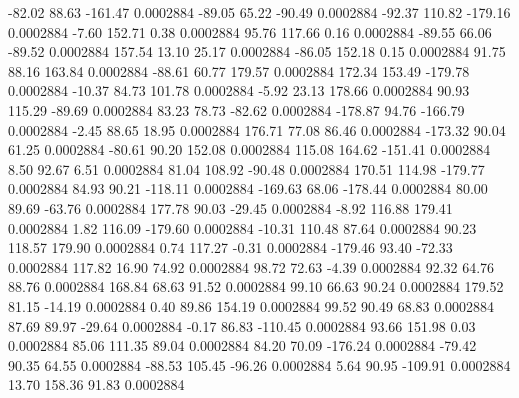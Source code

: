       -82.02       88.63     -161.47     0.0002884
      -89.05       65.22      -90.49     0.0002884
      -92.37      110.82     -179.16     0.0002884
       -7.60      152.71        0.38     0.0002884
       95.76      117.66        0.16     0.0002884
      -89.55       66.06      -89.52     0.0002884
      157.54       13.10       25.17     0.0002884
      -86.05      152.18        0.15     0.0002884
       91.75       88.16      163.84     0.0002884
      -88.61       60.77      179.57     0.0002884
      172.34      153.49     -179.78     0.0002884
      -10.37       84.73      101.78     0.0002884
       -5.92       23.13      178.66     0.0002884
       90.93      115.29      -89.69     0.0002884
       83.23       78.73      -82.62     0.0002884
     -178.87       94.76     -166.79     0.0002884
       -2.45       88.65       18.95     0.0002884
      176.71       77.08       86.46     0.0002884
     -173.32       90.04       61.25     0.0002884
      -80.61       90.20      152.08     0.0002884
      115.08      164.62     -151.41     0.0002884
        8.50       92.67        6.51     0.0002884
       81.04      108.92      -90.48     0.0002884
      170.51      114.98     -179.77     0.0002884
       84.93       90.21     -118.11     0.0002884
     -169.63       68.06     -178.44     0.0002884
       80.00       89.69      -63.76     0.0002884
      177.78       90.03      -29.45     0.0002884
       -8.92      116.88      179.41     0.0002884
        1.82      116.09     -179.60     0.0002884
      -10.31      110.48       87.64     0.0002884
       90.23      118.57      179.90     0.0002884
        0.74      117.27       -0.31     0.0002884
     -179.46       93.40      -72.33     0.0002884
      117.82       16.90       74.92     0.0002884
       98.72       72.63       -4.39     0.0002884
       92.32       64.76       88.76     0.0002884
      168.84       68.63       91.52     0.0002884
       99.10       66.63       90.24     0.0002884
      179.52       81.15      -14.19     0.0002884
        0.40       89.86      154.19     0.0002884
       99.52       90.49       68.83     0.0002884
       87.69       89.97      -29.64     0.0002884
       -0.17       86.83     -110.45     0.0002884
       93.66      151.98        0.03     0.0002884
       85.06      111.35       89.04     0.0002884
       84.20       70.09     -176.24     0.0002884
      -79.42       90.35       64.55     0.0002884
      -88.53      105.45      -96.26     0.0002884
        5.64       90.95     -109.91     0.0002884
       13.70      158.36       91.83     0.0002884
